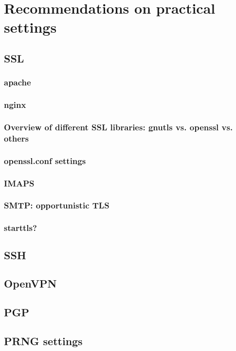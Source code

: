 \section{Recommendations on practical settings}


\subsection{SSL}
\subsubsection{apache}
\subsubsection{nginx}
\subsubsection{Overview of different SSL libraries: gnutls vs. openssl vs. others}
\subsubsection{openssl.conf settings}
\subsubsection{IMAPS}
\subsubsection{SMTP: opportunistic TLS}
\subsubsection{starttls?}

\subsection{SSH}

\subsection{OpenVPN}

\subsection{PGP}

\subsection{PRNG settings}
